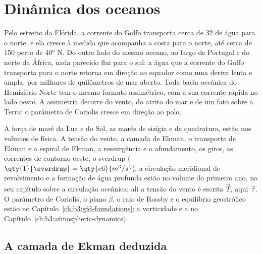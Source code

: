 \chapter{Dinâmica dos oceanos}\label{ch:b3:ocean-dynamics}

Pelo estreito da Flórida, a corrente do Golfo transporta cerca de
\qty{32}{\sverdrup} de água para o norte, e ela cresce à medida que acompanha a costa
para o norte, até cerca de \qty{150}{\sverdrup} perto de \ang{40} N. Do outro lado do mesmo oceano, ao largo de Portugal e do norte
da África, nada parecido flui para o sul: a água que a corrente do Golfo transporta
para o norte retorna em direção ao equador como uma deriva lenta e ampla, por milhares
de quilômetros de mar aberto. Toda bacia oceânica do Hemisfério Norte tem
o mesmo formato assimétrico, com a sua corrente rápida no lado oeste. A
assimetria decorre do vento, do atrito do mar e de um
fato sobre a Terra: o parâmetro de Coriolis cresce em direção ao polo.

\begin{recall}
A força de maré da Lua e do Sol, as marés de sizígia e de quadratura, estão nos
volumes de física. A tensão do vento, a camada de Ekman, o transporte de Ekman e
a espiral de Ekman, a ressurgência e o afundamento, os giros, as correntes
de contorno oeste, o sverdrup ($\qty{1}{\sverdrup} =
\qty{e6}{m^3/s}$), a circulação meridional de revolvimento e a
formação de água profunda estão no volume do primeiro ano, no seu capítulo sobre a
circulação oceânica; ali a tensão do vento é escrita $\vec T$, aqui
$\vec\tau$. O parâmetro de Coriolis, o plano $\beta$, o raio de Rossby
e o equilíbrio geostrófico estão no Capítulo~\ref{ch:b3:gfd-foundations};
a vorticidade e a  no Capítulo~\ref{ch:b3:atmospheric-dynamics}.
\end{recall}

\section{A camada de Ekman deduzida}\label{sec:b3:ocean-dynamics:ekman}

